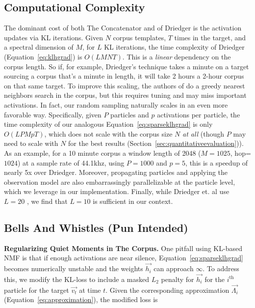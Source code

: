 \documentclass{article}
\begin{document}
\subsection{Computational Complexity} 
\label{sec:complexity}
The dominant cost of both The Concatenator and of Driedger is the activation updates via KL iterations.  Given $N$ corpus templates, $T$ times in the target, and a spectral dimension of $M$, for $L$ KL iterations, the time complexity of Driedger (Equation~\ref{eq:klhgrad}) is $O(LMNT)$.  This is a {\em linear} dependency on the corpus length.  So if, for example, Driedger's technique takes a minute on a target sourcing a corpus that's a minute in length, it will take 2 hours a 2-hour corpus on that same target.  To improve this scaling, the authors of \cite{buch2017nichtnegativematrixfaktorisierungnutzendesklangsynthesensystem} do a greedy nearest neighbors search in the corpus, but this requires tuning and may miss important activations.  In fact, our random sampling naturally scales in an even more favorable way.  Specifically, given $P$ particles and $p$ activations per particle, the time complexity of our analogous Equation~\ref{eq:sparseklhgrad} is only $O(LPMpT)$, which does not scale with the corpus size $N$ {\em at all} (though $P$ may need to scale with $N$ for the best results (Section~\ref{sec:quantitativeevaluation})).  As an example, for a 10 minute corpus a window length of 2048 ($M=1025$, hop=$1024$) at a sample rate of 44.1khz, using $P=1000$ and $p=5$, this is a speedup of nearly 5x over Driedger.  Moreover, propagating particles and applying the observation model are also embarrassingly parallelizable at the particle level, which we leverage in our implementation.  Finally, while Driedger et. al use $L=20$ \cite{driedger2015let}, we find that $L=10$ is sufficient in our context.


\subsection{Bells And Whistles (Pun Intended)}

\textbf{Regularizing Quiet Moments in The Corpus.} One pitfall using KL-based NMF is that if enough activations are near silence, Equation~\ref{eq:sparseklhgrad} becomes numerically unstable and the weights $\vec{h_i}$ can approach $\infty$.  To address this, we modify the KL-loss to include a masked $L_2$ penalty for $\vec{h_i}$ for the $i^{\text{th}}$ particle for the target $\vec{v_t}$ at time $t$.  Given the corresponding approximation $\vec{\Lambda_i}$ (Equation~\ref{eq:approximation}), the modified loss is
\end{document}
